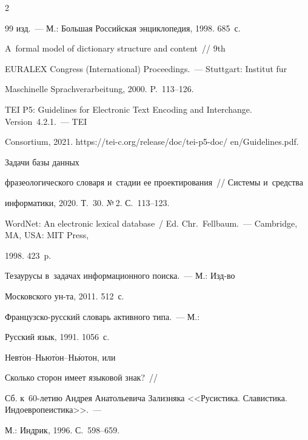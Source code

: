 \begin{multicols}{2}
{{\begin{thebibliography}{99}
изд.~--- М.: Большая Российская энциклопедия, 1998. 685~с.




 A~formal model of dictionary structure and content~// 9th 


EURALEX Congress (International) Proceedings.~--- Stuttgart: Institut f$\ddot{\mbox{u}}$r 


Maschinelle Sprachverarbeitung, 2000. P.~113--126.




TEI P5: Guidelines for Electronic Text Encoding and Interchange. Version~4.2.1.~--- TEI 


Consortium, 2021. {\sf https://tei-c.org/release/doc/tei-p5-doc/ en/Guidelines.pdf}.




 Задачи базы данных 


фразеологического словаря и~стадии ее проектирования~// Системы и~средства 


информатики, 2020. Т.~30. №\,2. С.~113--123.




WordNet: An electronic lexical database~/ Ed. Chr.~Fellbaum.~--- Cambridge, MA, USA: MIT Press, 


1998. 423~p.










 Тезаурусы в~задачах информационного поиска.~--- М.: Изд-во 


Московского ун-та, 2011. 512~с.




 Фран\-цуз\-ско-рус\-ский словарь активного типа.~--- М.: 


Русский язык, 1991. 1056~с.






Невт$\acute{\mbox{о}}$н--Ньют$\acute{\mbox{о}}$н--Нь$\acute{\mbox{ю}}$тон, или 


Сколько сторон имеет языковой знак?~//  


Сб. к~60-ле\-тию Андрея Анатольевича Зализняка <<Русистика. Славистика. Индоевропеистика>>.~--- 


М.: Индрик, 1996. С.~598--659.


 \end{thebibliography}





}


}





\end{multicols}





